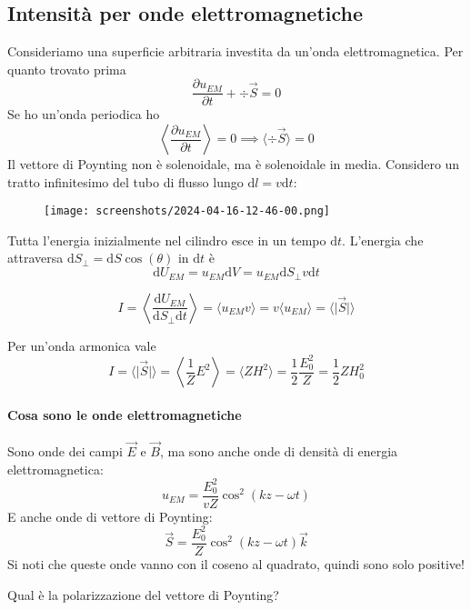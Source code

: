\subsection{Intensità per onde elettromagnetiche}
Consideriamo una superficie arbitraria investita da un'onda elettromagnetica. Per quanto trovato prima
\begin{equation}
	\frac{\partial u_{EM} }{\partial t} + \div \vec{S}=0 
\end{equation}
Se ho un'onda periodica ho
\begin{equation}
	\left\langle \frac{\partial u_{EM} }{\partial t} \right\rangle = 0 \implies \langle \div \vec{S} \rangle = 0  
\end{equation}
Il vettore di Poynting non è solenoidale, ma è solenoidale in media. Considero un tratto infinitesimo del tubo di flusso lungo \(\mathrm{d} l = v \mathrm{d} t\):
\begin{figure}[H]
	\centering
	\texttt{[image: screenshots/2024-04-16-12-46-00.png]}
\end{figure}
Tutta l'energia inizialmente nel cilindro esce in un tempo \(\mathrm{d} t\). L'energia che attraversa \(\mathrm{d} S_\perp=\mathrm{d} S \cos (\theta )\) in \(\mathrm{d} t\) è
\begin{equation}
	\mathrm{d} U_{EM} =u_{EM} \mathrm{d} V = u_{EM} \mathrm{d} S_\perp v \mathrm{d} t
\end{equation}
\begin{definition}
	\begin{equation}
		I = \left\langle \frac{\mathrm{d} U_{EM} }{\mathrm{d} S_\perp \mathrm{d} t} \right\rangle = \langle u_{EM} v \rangle = v \langle u_{EM} \rangle = \langle \vert \vec{S} \vert  \rangle   
	\end{equation}
\end{definition}
Per un'onda armonica vale
\begin{equation}
	I = \langle \vert \vec{S} \vert  \rangle = \left\langle \frac{1}{Z} E^{2} \right\rangle = \langle Z H^{2}  \rangle = \frac{1}{2} \frac{E_0 ^{2} }{Z} = \frac{1}{2}Z H_0 ^{2} 
\end{equation}

\paragraph{Cosa sono le onde elettromagnetiche}
Sono onde dei campi \(\vec{E}\) e \(\vec{B}\), ma sono anche onde di densità di energia elettromagnetica:
\begin{equation}
	u_{EM} = \frac{E_0 ^{2} }{v Z} \cos ^{2} (kz-\omega t)
\end{equation}
E anche onde di vettore di Poynting:
\begin{equation}
	\vec{S} = \frac{E_0 ^{2} }{Z} \cos ^{2} (kz - \omega t) \vec{k}
\end{equation}
Si noti che queste onde vanno con il coseno al quadrato, quindi sono solo positive!

\begin{note}
	Qual è la polarizzazione del vettore di Poynting?
\end{note}